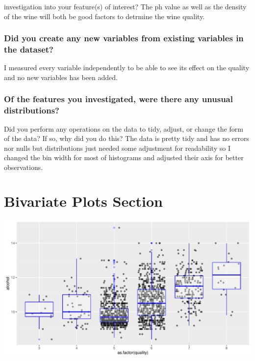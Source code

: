 \documentclass[]{article}
\begin{document}
investigation into your feature(s) of interest? The ph value as well as
the density of the wine will both be good factors to detrmine the wine
quality.

\hypertarget{did-you-create-any-new-variables-from-existing-variables-in-the-dataset}{%
\subsubsection{Did you create any new variables from existing variables
in the
dataset?}\label{did-you-create-any-new-variables-from-existing-variables-in-the-dataset}}

I measured every variable independently to be able to see its effect on
the quality and no new variables has been added.

\hypertarget{of-the-features-you-investigated-were-there-any-unusual-distributions}{%
\subsubsection{\texorpdfstring{Of the features you investigated, were
there any unusual distributions?\\
}{Of the features you investigated, were there any unusual distributions? }}\label{of-the-features-you-investigated-were-there-any-unusual-distributions}}

Did you perform any operations on the data to tidy, adjust, or change
the form\\
of the data? If so, why did you do this? The data is pretty tidy and has
no errors nor nulls but distributions just needed some adjustment for
readability so I changed the bin width for most of histograms and
adjusted their axis for better observations.

\hypertarget{bivariate-plots-section}{%
\section{Bivariate Plots Section}\label{bivariate-plots-section}}

\begin{center}\includegraphics{Figs/Bivariate_Plots-1} \end{center}
\end{document}

